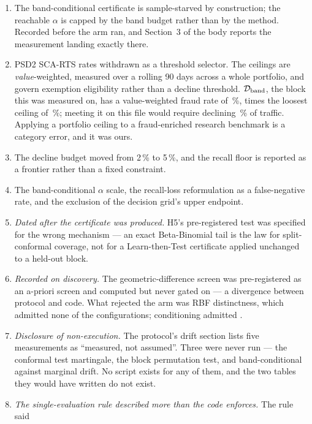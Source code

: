 \begin{enumerate}[label=A\arabic*.]
\item The band-conditional certificate is sample-starved by construction; the reachable
  $\alpha$ is capped by the band budget rather than by the method. Recorded before the arm ran,
  and Section~3 of the body reports the measurement landing exactly there.
\item PSD2 SCA-RTS rates withdrawn as a threshold selector. The ceilings are
  \emph{value}-weighted, measured over a rolling 90 days across a whole portfolio, and govern
  exemption eligibility rather than a decline threshold. $\mathcal{D}_{\mathrm{band}}$, the block this was measured on, has a
  value-weighted fraud rate of \ClaimBandValueFraudRate\,\%, \ClaimBandFraudVersusCeiling{} times the loosest
  ceiling of \ClaimPsdLoosestCeiling\,\%; meeting it on this file would
  require declining \ClaimPsdDeclineRate\,\% of traffic. Applying a portfolio ceiling to a fraud-enriched
  research benchmark is a category error, and it was ours.
\item The decline budget moved from 2\,\% to 5\,\%, and the recall floor is reported as a
  frontier rather than a fixed constraint.
\item The band-conditional $\alpha$ scale, the recall-loss reformulation as a false-negative
  rate, and the exclusion of the decision grid's upper endpoint.
\item \emph{Dated after the certificate was produced.} H5's pre-registered test was specified
  for the wrong mechanism --- an exact Beta-Binomial tail is the law for split-conformal
  coverage, not for a Learn-then-Test certificate applied unchanged to a held-out block.
\item \emph{Recorded on discovery.} The geometric-difference screen was pre-registered as an
  a-priori screen and computed but never gated on --- a divergence between protocol and code.
  What rejected the arm was RBF distinctness, which admitted none of the
  \ClaimScreenConfigs{} configurations; conditioning admitted \ClaimScreenPassConditioning{}.
\item \emph{Disclosure of non-execution.} The protocol's drift section lists five measurements
  as ``measured, not assumed''. Three were never run --- the conformal test martingale, the
  block permutation test, and band-conditional against marginal drift. No script exists for any
  of them, and the two tables they would have written do not exist.
\item \emph{The single-evaluation rule described more than the code enforces.} The rule said

\end{enumerate}

